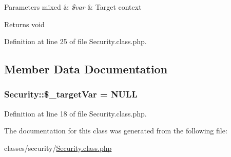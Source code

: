 \begin{DoxyParams}[1]{Parameters}
mixed & {\em \$var} & Target context \\
\hline
\end{DoxyParams}
\begin{DoxyReturn}{Returns}
void 
\end{DoxyReturn}


Definition at line 25 of file Security.\-class.\-php.



\subsection{Member Data Documentation}
\hypertarget{classSecurity_a28ff37b08bd7a592552cf5af13f7ac74}{
\subsubsection[{\$\-\_\-target\-Var}]{\setlength{\rightskip}{0pt plus 5cm}Security\-::\$\-\_\-target\-Var = N\-U\-L\-L}}\label{classSecurity_a28ff37b08bd7a592552cf5af13f7ac74}


Definition at line 18 of file Security.\-class.\-php.



The documentation for this class was generated from the following file\-:\begin{DoxyCompactItemize}
\item 
classes/security/\hyperlink{Security_8class_8php}{Security.\-class.\-php}\end{DoxyCompactItemize}
